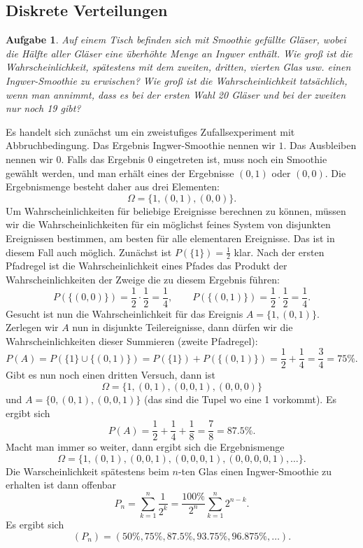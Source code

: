 \documentclass[a4paper,10pt,fleqn,twoside]{scrartcl}
\numberwithin{equation}{section}
\newcommand{\strong}[1]{{\normalfont\sffamily\bfseries #1}}
\theoremstyle{Aufgabe}
\newtheorem{Aufgabe}{\sffamily Aufgabe}[section]
\begin{document}
\subsection{Diskrete Verteilungen}
\begin{Aufgabe}
Auf einem Tisch befinden sich mit Smoothie gefüllte Gläser, wobei
die Hälfte aller Gläser eine überhöhte Menge an Ingwer enthält.
Wie groß ist die Wahrscheinlichkeit, spätestens mit dem zweiten,
dritten, vierten Glas usw. einen Ingwer-Smoothie zu erwischen?
Wie groß ist die Wahrscheinlichkeit tatsächlich, wenn man annimmt,
dass es bei der ersten Wahl 20 Gläser und bei der zweiten nur noch
19 gibt?
\end{Aufgabe}

\noindent\strong{Lösung.}
Es handelt sich zunächst um ein zweistufiges Zufallsexperiment
mit Abbruchbedingung. Das Ergebnis Ingwer-Smoothie nennen wir $1$.
Das Ausbleiben nennen wir $0$. Falls das Ergebnis $0$ eingetreten ist,
muss noch ein Smoothie gewählt werden, und man erhält eines der
Ergebnisse $(0,1)$ oder $(0,0)$. Die Ergebnismenge besteht daher
aus drei Elementen:
\[\Omega = \{1,(0,1),(0,0)\}.\]
Um Wahrscheinlichkeiten für beliebige Ereignisse berechnen zu können,
müssen wir die Wahrscheinlichkeiten für ein möglichst feines System
von disjunkten Ereignissen bestimmen, am besten für alle elementaren
Ereignisse. Das ist in diesem Fall auch möglich. Zunächst ist
$P(\{1\})=\frac{1}{2}$ klar. Nach der ersten Pfadregel ist die
Wahrscheinlichkeit eines Pfades das Produkt der
Wahrscheinlichkeiten der Zweige die zu diesem Ergebnis führen:%
\[P(\{(0,0)\}) = \frac{1}{2}\cdot\frac{1}{2} = \frac{1}{4},\qquad
P(\{(0,1)\}) = \frac{1}{2}\cdot\frac{1}{2} = \frac{1}{4}.
\]
Gesucht ist nun die Wahrscheinlichkeit für das Ereignis
$A=\{1,(0,1)\}$. Zerlegen wir $A$ nun in disjunkte Teilereignisse,
dann dürfen wir die Wahrscheinlichkeiten dieser Summieren (zweite
Pfadregel):
\[P(A) = P(\{1\}\cup\{(0,1)\}) = P(\{1\})+P(\{(0,1)\})
= \frac{1}{2}+\frac{1}{4} = \frac{3}{4} = 75\%.\]
Gibt es nun noch einen dritten Versuch, dann ist
\[\Omega = \{1,(0,1),(0,0,1),(0,0,0)\}\]
und $A=\{0,(0,1),(0,0,1)\}$ (das sind die Tupel wo eine 1 vorkommt).
Es ergibt sich
\[P(A) = \frac{1}{2}+\frac{1}{4}+\frac{1}{8} = \frac{7}{8} = 87.5\%.\]
Macht man immer so weiter, dann ergibt sich die Ergebnismenge
\[\Omega = \{1,(0,1),(0,0,1),(0,0,0,1),(0,0,0,0,1),\ldots\}.\]
Die Warscheinlichkeit spätestens beim $n$-ten Glas einen Ingwer-Smoothie
zu erhalten ist dann offenbar
\[P_n = \sum_{k=1}^n \frac{1}{2^k} = \frac{100\%}{2^n}\sum_{k=1}^n 2^{n-k}.\]
Es ergibt sich
\[(P_n) = (50\%,75\%,87.5\%,93.75\%,96.875\%,\ldots).\]
\end{document}
